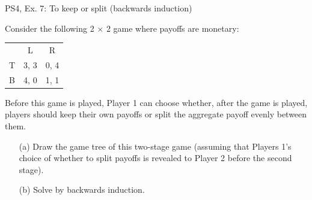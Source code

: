 \begin{frame}{PS4, Ex. 7: To keep or split (backwards induction)}
  \begin{multicols}{2}
    Consider the following 2 × 2 game where payoffs are monetary:
    \begin{table}
      \begin{tabular}{l|c|c|}
          \multicolumn{1}{c}{} & \multicolumn{1}{c}{L} & \multicolumn{1}{c}{R} \\\cline{2-3}
          T & 3, 3 & 0, 4 \\\cline{2-3}
          B & 4, 0 & 1, 1 \\\cline{2-3}
      \end{tabular}
    \end{table}
    Before this game is played, Player 1 can choose whether, after the game is played, players should keep their own payoffs or split the aggregate payoff evenly between them.
  \vfill\null \columnbreak
    \begin{itemize}
      \item[(a)] Draw the game tree of this two-stage game (assuming that Players 1’s choice of whether to split payoffs is revealed to Player 2 before the second stage).
      \item[(b)] Solve by backwards induction.
    \end{itemize}
  \vfill\null
  \end{multicols}
\end{frame}

